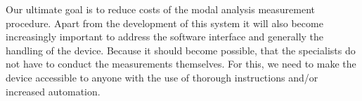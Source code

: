 Our ultimate goal is to reduce costs of the modal analysis measurement procedure. Apart from the development of this system it will also become increasingly important to address the software interface and generally the handling of the device. Because it should become possible, that the specialists do not have to conduct the measurements themselves. For this, we need to make the device accessible to anyone with the use of thorough instructions and/or increased automation.



%
